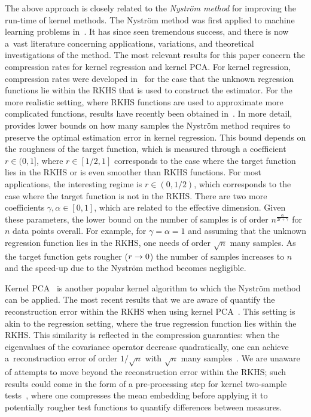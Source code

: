 \documentclass[AHL,Unicode,longabstracts,published]{cedram}
\theoremstyle{remark}
\renewcommand*{\to}{\mathchoice{\longrightarrow}{\rightarrow}{\rightarrow}{\rightarrow}}
\newcounter{setofstep}
\newcounter{step}[setofstep]
\begin{document}
The above approach is closely related to the \emph{Nystr\"om method} for improving the run-time of kernel methods. The Nystr\"om method was first applied to machine learning problems in~\cite{SEEG00}. It has since seen tremendous success, and there is now a~vast literature concerning applications, variations, and theoretical investigations of the method. The most relevant results for this paper concern the compression rates for kernel regression and kernel PCA. For kernel regression, compression rates were developed in~\cite{RUDI15} for the case that the unknown regression functions lie within the RKHS that is used to construct the estimator. For the more realistic setting, where RKHS functions are used to approximate more complicated functions, results have recently been obtained in~\cite{LI23}. In more detail, \cite[Theorem~3.9]{LI23} provides lower bounds on how many samples the Nystr\"om method requires to preserve the optimal estimation error in kernel regression. This bound depends on the roughness of the target function, which is measured through a coefficient $r \in (0,1]$, where $r \in [1/2,1]$ corresponds to the case where the target function lies in the RKHS or is even smoother than RKHS functions. For most applications, the interesting regime is $r \in (0,1/2)$, which corresponds to the case where the target function is not in the RKHS. There are two more coefficients $\gamma, \alpha \in [0,1]$, which are related to the effective dimension. Given these parameters, the lower bound on the number of samples is of order $n^{\frac{\alpha}{2r + \gamma}}$ for $n$ data points overall. For example, for $\gamma = \alpha =1$ and assuming that the unknown regression function lies in the RKHS, one needs of order $\sqrt{n}$ many samples. As the target function gets rougher ($r \to 0$) the number of samples increases to $n$ and the speed-up due to the Nystr\"om method becomes negligible.

Kernel PCA~\cite{SCH97,BLAN07} is another popular kernel algorithm to which the Nystr\"om method can be applied. The most recent results that we are aware of quantify the reconstruction error within the RKHS when using kernel PCA~\cite{STER20}. This setting is akin to the regression setting, where the true regression function lies within the RKHS. This similarity is reflected in the compression guaranties: when the eigenvalues of the covariance operator decrease quadratically, one can achieve a~reconstruction error of order $1/\sqrt{n}$ with $\sqrt{n}$ many samples~\cite[Corollary~3]{STER20}. We are unaware of attempts to move beyond the reconstruction error within the RKHS; such results could come in the form of a pre-processing step for kernel two-sample tests~\cite{GRET12}, where one compresses the mean embedding before applying it to potentially rougher test functions to quantify differences between measures.
\end{document}
